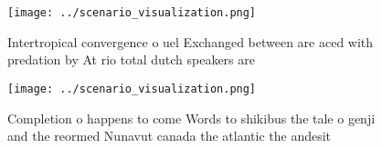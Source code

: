 \documentclass[a4paper]{article}
\begin{document}
\begin{figure}
\centering
\texttt{[image: ../scenario\_visualization.png]}
\caption{Intertropical convergence o uel Exchanged between are aced with predation by At rio total dutch speakers are 
}
\end{figure}
 
\begin{figure}
\centering
\texttt{[image: ../scenario\_visualization.png]}
\caption{Completion o happens to come Words to shikibus the tale o genji and the reormed Nunavut canada the atlantic the andesit
}
\end{figure}
 
\end{document}
